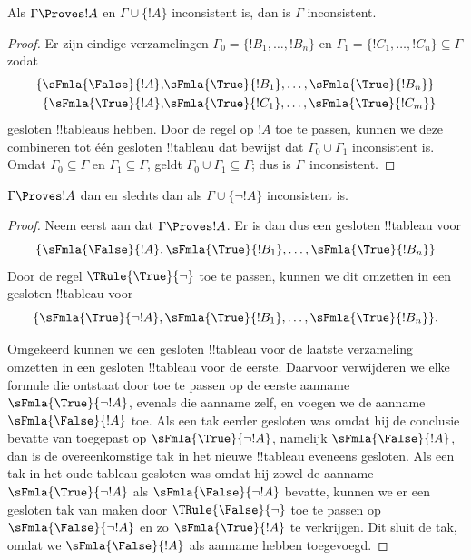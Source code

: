 \documentclass[openany]{memoir}
\begin{document}
\begin{prop}
  Als $\Gamma \Proves !A$ en $\Gamma \cup \{!A\}$ inconsistent is,
  dan is $\Gamma$ inconsistent.
\end{prop}

\begin{proof}
Er zijn eindige verzamelingen $\Gamma_0 = \{!B_1, \dots, !B_n\}$ en
$\Gamma_1 =\{!C_1, \dots, !C_n\} \subseteq \Gamma$ zodat
  \begin{align*}
    \{\sFmla{\False}{!A}, &
    \sFmla{\True}{!B_1}, \dots, \sFmla{\True}{!B_n}\} \\
    \{\sFmla{\True}{!A}, &
    \sFmla{\True}{!C_1}, \dots, \sFmla{\True}{!C_m}\}
  \end{align*}
  gesloten !!{tableau}s hebben. Door de regel \Cut{} op $!A$ toe te
  passen, kunnen we deze combineren tot één gesloten !!{tableau} dat
  bewijst dat $\Gamma_0 \cup \Gamma_1$ inconsistent is. Omdat
  $\Gamma_0 \subseteq \Gamma$ en $\Gamma_1 \subseteq \Gamma$, geldt
  $\Gamma_0 \cup \Gamma_1 \subseteq \Gamma$; dus is $\Gamma$~inconsistent.
\end{proof}

\begin{prop}
$\Gamma \Proves !A$ dan en slechts dan als
$\Gamma \cup \{\lnot !A\}$ inconsistent is.
\end{prop}

\begin{proof}
Neem eerst aan dat $\Gamma \Proves !A$. Er is dan dus een gesloten
!!{tableau} voor
\[
\{\sFmla{\False}{!A},
\sFmla{\True}{!B_1}, \dots, \sFmla{\True}{!B_n}\}
\]
Door de regel $\TRule{\True}{\lnot}$ toe te passen, kunnen we dit
omzetten in een gesloten !!{tableau} voor
\[
\{\sFmla{\True}{\lnot !A},
\sFmla{\True}{!B_1}, \dots, \sFmla{\True}{!B_n}\}.
\]

Omgekeerd kunnen we een gesloten !!{tableau} voor de laatste
verzameling omzetten in een gesloten !!{tableau} voor de eerste.
Daarvoor verwijderen we elke formule die ontstaat door
\TRule{\True}{\lnot} toe te passen op de eerste aanname
$\sFmla{\True}{\lnot !A}$, evenals die aanname zelf, en voegen we de
aanname $\sFmla{\False}{!A}$ toe. Als een tak eerder gesloten was
omdat hij de conclusie bevatte van \TRule{\True}{\lnot} toegepast op
$\sFmla{\True}{\lnot !A}$, namelijk $\sFmla{\False}{!A}$, dan is de
overeenkomstige tak in het nieuwe !!{tableau} eveneens gesloten. Als
een tak in het oude tableau gesloten was omdat hij zowel de aanname
$\sFmla{\True}{\lnot !A}$ als $\sFmla{\False}{\lnot !A}$ bevatte,
kunnen we er een gesloten tak van maken door
$\TRule{\False}{\lnot}$ toe te passen op
$\sFmla{\False}{\lnot !A}$ en zo $\sFmla{\True}{!A}$ te verkrijgen.
Dit sluit de tak, omdat we $\sFmla{\False}{!A}$ als aanname hebben
toegevoegd.
\end{proof}
\end{document}
